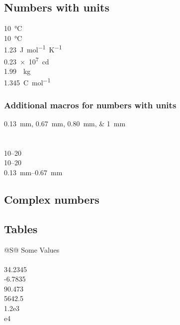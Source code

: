 \documentclass[12pt]{article}
\begin{document}
\subsection*{Numbers with units}
\qty{10}{\celsius} \\
\qty{10}{\degreeCelsius} \\
\qty{1.23}{J.mol^{-1}.K^{-1}} \\
\qty{.23e7}{\candela} \\
\qty[per-mode = symbol]{1.99}{\per\kilogram} \\
\qty[per-mode = fraction]{1,345}{\coulomb\per\mole}

\subsubsection*{Additional macros for numbers with units}
\qtylist{0.13;0.67;0.80;1}{\milli\metre}\\
 \\
 \\
\numrange{10}{20} \\
\numrange[range-phrase=--]{10}{20} \\
\qtyrange{0.13}{0.67}{\milli\metre} \\

\subsection*{Complex numbers}

\clearpage
\subsection*{Tables}
\begin{table}[h!]
    \centering
    \caption{Standard behaviour of the \texttt{S} column type.%
    \label{tab:S:standard}}
    \begin{tabular}{@{}S@{}}
    \toprule
    {Some Values} \\
     \\
    34.2345 \\
    -6.7835 \\
    90.473 \\
    5642.5 \\
    1.2e3 \\
    e4 \\
    \bottomrule
    \end{tabular}
\end{table}
\end{document}

